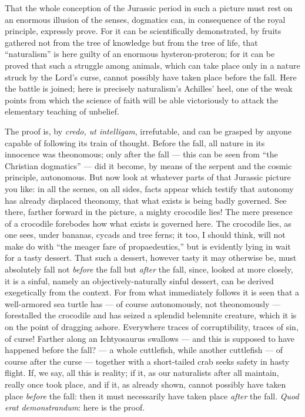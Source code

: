 \documentclass[12pt]{book}
\newcommand{\opage}[1]{\marginnote{\footnotesize\textit{[#1]}}}
\begin{document}
That the whole conception of the Jurassic period in such a picture must rest on an enormous illusion of the senses, dogmatics can, in consequence of the royal principle, expressly prove. For it can be scientifically demonstrated, by fruits gathered not from the tree of knowledge but from the tree of life, that ``naturalism'' is here guilty of an enormous hysteron-proteron; for it can be proved that such a struggle among animals, which can take place only in a nature struck by the Lord's curse, cannot possibly have taken place before the fall. Here the battle is joined; here is precisely naturalism's Achilles' heel, one of the weak points from which the science of faith will be able victoriously to attack the elementary teaching of unbelief.

The proof is, by \textit{credo, ut intelligam}, irrefutable, and can be grasped by anyone capable of following its train of thought. Before the fall, all nature in its innocence was theonomous; only after the fall --- this can be seen from ``the Christian dogmatics'' --- did it become, by means of the serpent and the
\opage{23}\setcounter{footnote}{0}%
cosmic principle, autonomous. But now look at whatever parts of that Jurassic picture you like: in all the scenes, on all sides, facts appear which testify that autonomy has already displaced theonomy, that what exists is being badly governed. See there, farther forward in the picture, a mighty crocodile lies! The mere presence of a crocodile forebodes how what exists is governed here. The crocodile lies, as one sees, under bananas, cycads and tree ferns; it too, I should think, will not make do with ``the meager fare of propaedeutics,'' but is evidently lying in wait for a tasty dessert. That such a dessert, however tasty it may otherwise be, must absolutely fall not \emph{before} the fall but \emph{after} the fall, since, looked at more closely, it is a sinful, namely an objectively-naturally sinful dessert, can be derived exegetically from the context. For from what immediately follows it is seen that a well-armored sea turtle has --- of course autonomously, not theonomously --- forestalled the crocodile and has seized a splendid belemnite creature, which it is on the point of dragging ashore. Everywhere traces of corruptibility, traces of sin, of curse! Farther along an Ichtyosaurus swallows --- and this is supposed to have happened before the fall? --- a whole cuttlefish, while another cuttlefish --- of course after the curse --- together with a short-tailed crab seeks safety in hasty flight. If, we say, all this is reality; if it, as our naturalists after all maintain, really once took place, and if it, as already shown, cannot possibly have taken place \emph{before} the fall: then it must necessarily have taken place \emph{after} the fall. \textit{Quod erat demonstrandum}: here is the proof.
\end{document}
